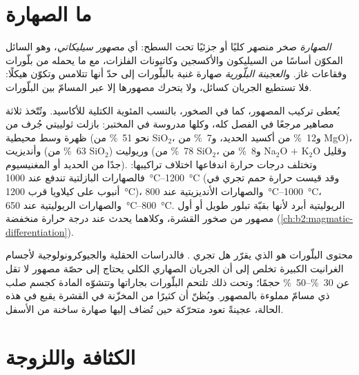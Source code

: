 \section{ما الصهارة}

\begin{definition}[الصهارة]\label{def:b2:magma-emplacement:magma}
\emph{الصهارة} صخر منصهر كليًا أو جزئيًا تحت السطح: أي
\emph{مصهور سيليكاتي}، وهو السائل المكوّن أساسًا من السيليكون
والأكسجين وكاتيونات الفلزات، مع ما يحمله من بلّورات وفقاعات غاز.
و\emph{العجينة البلّورية} صهارة غنية بالبلّورات إلى حدّ أنها
تتلامس وتكوّن هيكلًا: فلا تستطيع الجريان كسائل، ولا يتحرك مصهورها إلا
عبر المسامّ بين البلّورات.
\end{definition}

يُعطى تركيب المصهور، كما في الصخور، بالنسب المئوية الكتلية
للأكاسيد. وتُتّخذ ثلاثة مصاهير مرجعًا في الفصل كله، وكلها
مدروسة في المختبر: بازلت ثولييتي جُرف من ظهرة وسط محيطية
(نحو \qty{51}{\percent} من SiO$_2$، و\qty{12}{\percent} من أكسيد الحديد، و\qty{7}{\percent}
من MgO)، وأنديزيت (\qty{63}{\percent} من SiO$_2$) وريوليت (\qty{78}{\percent}
من SiO$_2$، و\qty{8}{\percent} من Na$_2$O $+$ K$_2$O وقليل جدًا من الحديد أو المغنيسيوم).
وتختلف درجات حرارة اندفاعها اختلاف تراكيبها: فالصهارات
البازلتية تندفع عند \qtyrange{1000}{1200}{\celsius} (وقد قيست حرارة حمم تجري في أنبوب
على كيلاويا قرب \qty{1200}{\celsius})، والصهارات الأنديزيتية عند
\qtyrange{800}{1000}{\celsius}، والصهارات الريوليتية عند \qtyrange{650}{800}{\celsius}.
 الريوليتية أبرد لأنها بقيّة تبلور طويل
أو أول مصهور من صخور القشرة، وكلاهما يحدث عند درجة حرارة منخفضة
(\cref{ch:b2:magmatic-differentiation}).

محتوى البلّورات هو الذي يقرّر هل تجري . فالدراسات الحقلية والجيوكرونولوجية
لأجسام الغرانيت الكبيرة تخلص إلى أن الجريان الصهاري الكلي يحتاج إلى حصّة
مصهور لا تقل عن \qtyrange{30}{50}{\percent} حجمًا؛ وتحت ذلك تلتحم
البلّورات بجاراتها وتتشوّه المادة كجسم صلب ذي مسامّ
مملوءة بالمصهور. ويُظنّ أن كثيرًا من  المخزّنة في القشرة يقبع في
هذه الحالة، عجينةً تعود متحرّكة حين تُضاف إليها صهارة ساخنة من
الأسفل.

\section{الكثافة واللزوجة}

